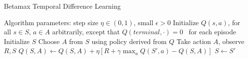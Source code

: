 \documentclass[11pt]{article} %
\begin{document}
\begin{algorithm}
  \caption{Betamax Temporal Difference Learning}

  \State Algorithm parameters: step size $\eta \in (0, 1)$, small $\epsilon > 0$
  \State Initialize $Q(s,a)$, for all $s \in S$, $a \in A$ arbitrarily, except that $Q(terminal,\cdot) = 0$
  \State
  \Loop \ for each episode
    \State Initialize $S$
      \State Choose $A$ from $S$ using policy derived from $Q$
      \State Take action $A$, observe $R, S$
      \State $Q(S, A) \leftarrow Q(S, A) + \eta \left[ R + \gamma \max_a Q(S',a) − Q(S, A) \right] $
      \State $S \leftarrow S'$
    \EndWhile
  \EndLoop

\end{algorithm}
\end{document}
